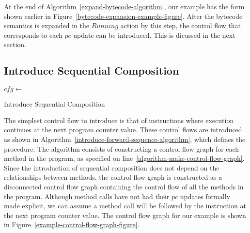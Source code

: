 At the end of Algorithm~\ref{expand-bytecode-algorithm}, our example
has the form shown earlier in
Figure~\ref{bytecode-expansion-example-figure}.
After the bytecode semantics is expanded in the $Running$ action by
this step, the control flow that corresponds to each $pc$ update can
be introduced.
This is dicussed in the next section.

\subsection{Introduce Sequential Composition}
\label{introduce-forward-sequence-subsection}

\begin{algorithm}
  \begin{algorithmic}[1]
    \State $cfg \gets$ 
    \label{algorithm-make-control-flow-graph}
    \label{algorithm-sequence-cfg-loop}
    \label{algorithm-forward-sequence-condition}
    \State {}
    \label{algorithm-forward-sequence-application}
    \EndWhile
    \EndFor
    \EndProcedure
  \end{algorithmic}
  \caption{Introduce Sequential Composition}
  \label{introduce-forward-sequence-algorithm}
\end{algorithm}
The simplest control flow to introduce is that of instructions where
execution continues at the next program counter value.
These control flows are introduced as shown in
Algorithm~\ref{introduce-forward-sequence-algorithm}, which defines
the  procedure.
The algorithm consists of constructing a control flow graph for each
method in the program, as specified on
line~\ref{algorithm-make-control-flow-graph}.
Since the introduction of sequential composition does not depend on
the relationships between methods, the control flow graph is
constructed as a disconnected control flow graph containing the
control flow of all the methods in the program.
Although method calls have not had their $pc$ updates formally made
explicit, we can assume a method call will be followed by the
instruction at the next program counter value.
The control flow graph for our example is shown in
Figure~\ref{example-control-flow-graph-figure}.

